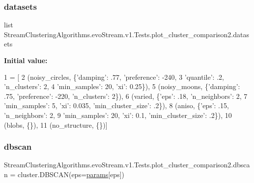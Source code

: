 \subsubsection{\texorpdfstring{datasets}{datasets}}
{\footnotesize\ttfamily list Stream\+Clustering\+Algorithms.\+evo\+Stream.\+v1.\+Tests.\+plot\+\_\+cluster\+\_\+comparison2.\+datasets}

{\bfseries Initial value\+:}
\begin{DoxyCode}
1 =  [
2     (noisy\_circles, \{\textcolor{stringliteral}{'damping'}: .77, \textcolor{stringliteral}{'preference'}: -240,
3                      \textcolor{stringliteral}{'quantile'}: .2, \textcolor{stringliteral}{'n\_clusters'}: 2,
4                      \textcolor{stringliteral}{'min\_samples'}: 20, \textcolor{stringliteral}{'xi'}: 0.25\}),
5     (noisy\_moons, \{\textcolor{stringliteral}{'damping'}: .75, \textcolor{stringliteral}{'preference'}: -220, \textcolor{stringliteral}{'n\_clusters'}: 2\}),
6     (varied, \{\textcolor{stringliteral}{'eps'}: .18, \textcolor{stringliteral}{'n\_neighbors'}: 2,
7               \textcolor{stringliteral}{'min\_samples'}: 5, \textcolor{stringliteral}{'xi'}: 0.035, \textcolor{stringliteral}{'min\_cluster\_size'}: .2\}),
8     (aniso, \{\textcolor{stringliteral}{'eps'}: .15, \textcolor{stringliteral}{'n\_neighbors'}: 2,
9              \textcolor{stringliteral}{'min\_samples'}: 20, \textcolor{stringliteral}{'xi'}: 0.1, \textcolor{stringliteral}{'min\_cluster\_size'}: .2\}),
10     (blobs, \{\}),
11     (no\_structure, \{\})]
\end{DoxyCode}
\mbox{\label{namespaceStreamClusteringAlgorithms_1_1evoStream_1_1v1_1_1Tests_1_1plot__cluster__comparison2_a5c87476c1a74958b836b769bd6cfb58e}} 
\subsubsection{\texorpdfstring{dbscan}{dbscan}}
{\footnotesize\ttfamily Stream\+Clustering\+Algorithms.\+evo\+Stream.\+v1.\+Tests.\+plot\+\_\+cluster\+\_\+comparison2.\+dbscan = cluster.\+D\+B\+S\+C\+AN(eps=\hyperlink{namespaceStreamClusteringAlgorithms_1_1evoStream_1_1v1_1_1Tests_1_1plot__cluster__comparison2_a1449d875d082f7c913611e6412520189}{params}\mbox{[}\textquotesingle{}eps\textquotesingle{}\mbox{]})}

